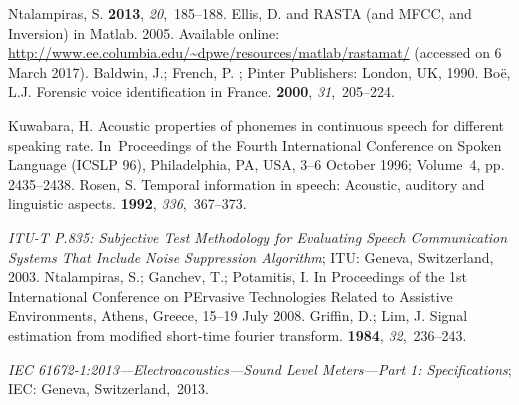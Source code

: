 \documentclass[sensors,article,accept,moreauthors,pdftex,10pt,a4paper]{mdpi}
\begin{document}
\begin{thebibliography}{999}
Ntalampiras, S.
 {\bf 2013}, {\em 20},~185--188.
Ellis, D.
 and {RASTA} (and {MFCC}, and Inversion) in {M}atlab. 2005.
\newblock Available online: \url{http://www.ee.columbia.edu/~dpwe/resources/matlab/rastamat/} ({accessed on} {6 March 2017}).
Baldwin, J.; French, P.
; Pinter Publishers: {London, }{UK}, 1990.
Bo{\"e}, L.J.
\newblock Forensic voice identification in France.
 {\bf 2000}, {\em 31},~205--224.

Kuwabara, H.
\newblock Acoustic properties of phonemes in continuous speech for different
  speaking rate.
\newblock  In~Proceedings of the Fourth International  Conference on Spoken Language (ICSLP 96),  {Philadelphia, PA, USA, 3--6 October} 1996; Volume~4, pp. 2435--2438.
Rosen, S.
\newblock Temporal information in speech: Acoustic, auditory and linguistic
  aspects.
 {\bf 1992}, {\em 336},~367--373.

{\em ITU-T P.835: Subjective Test Methodology for Evaluating Speech Communication
  Systems That Include Noise Suppression Algorithm}; {ITU: Geneva, Switzerland,} 2003.
Ntalampiras, S.; Ganchev, T.; Potamitis, I.
\newblock  In Proceedings of the 1st International Conference on PErvasive Technologies Related to
  Assistive Environments, {Athens, Greece, 15--19 July} 2008.
Griffin, D.; Lim, J.
\newblock Signal estimation from modified short-time fourier transform.
  {\bf 1984}, {\em 32},~236--243.

{\em IEC 61672-1:2013---Electroacoustics---Sound Level Meters---Part 1:
  Specifications}; {IEC: Geneva, Switzerland,}~2013.
\end{thebibliography}

\end{document}
